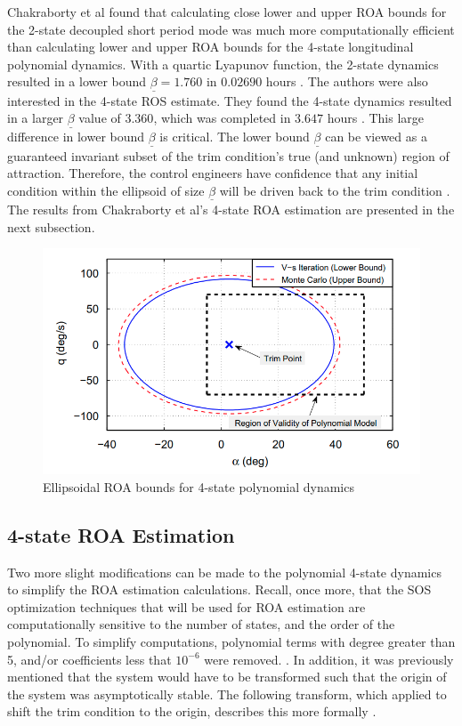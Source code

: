 \documentclass[%
 reprint,
 amsmath,amssymb,
 aps,
]{revtex4-2}
\begin{document}
Chakraborty et al found that calculating close lower and upper ROA bounds for the 2-state decoupled short period mode was much more computationally efficient than calculating lower and upper ROA bounds for the 4-state longitudinal polynomial dynamics. With a quartic Lyapunov function, the 2-state dynamics resulted in a lower bound $\underline{\beta} = 1.760$ in $0.02690$ hours \cite{primary}. The authors were also interested in the 4-state ROS estimate. They found the 4-state dynamics resulted in a larger $\underline{\beta}$ value of $3.360$, which was completed in $3.647$ hours \cite{primary}. This large difference in lower bound $\underline{\beta}$ is critical. The lower bound $\underline{\beta}$ can be viewed as a guaranteed invariant subset of the trim condition's true (and unknown) region of attraction. Therefore, the control engineers have confidence that any initial condition within the ellipsoid of size $\underline{\beta}$ will be driven back to the trim condition \cite{primary}. The results from Chakraborty et al's 4-state ROA estimation are presented in the next subsection.

\begin{figure}
    \centering
    \includegraphics[width=5in]{final_roa.png}
    \caption{Ellipsoidal ROA bounds for 4-state polynomial dynamics \cite{primary}}
    \label{fig:final}
\end{figure}

\subsection{4-state ROA Estimation}

Two more slight modifications can be made to the polynomial 4-state dynamics to simplify the ROA estimation calculations. Recall, once more, that the SOS optimization techniques that will be used for ROA estimation are computationally sensitive to the number of states, and the order of the polynomial. To simplify computations, polynomial terms with degree greater than 5, and/or coefficients less that $10^{-6}$ were removed. \cite{primary}. In addition, it was previously mentioned that the system would have to be transformed such that the origin of the system was asymptotically stable. The following transform, which applied to shift the trim condition to the origin, describes this more formally \cite{primary}.
\end{document}

